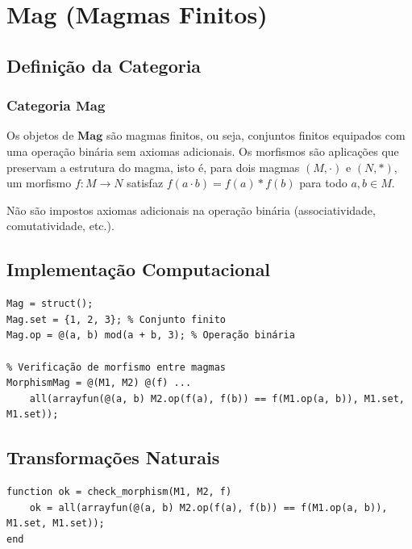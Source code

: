 \section{Mag (Magmas Finitos)}
\label{sec:mag}

\subsection{Definição da Categoria}

\subsubsection{Categoria $\mathbf{Mag}$}

\begin{definition}
    Os objetos de $\mathbf{Mag}$ são magmas finitos, ou seja, conjuntos finitos equipados com uma operação binária sem axiomas adicionais.
    Os morfismos são aplicações que preservam a estrutura do magma, isto é, para dois magmas $(M, \cdot)$ e $(N, \ast)$, um morfismo $f: M \to N$ satisfaz $f(a \cdot b) = f(a) \ast f(b)$ para todo $a, b \in M$.
\end{definition}

\begin{remark}
    Não são impostos axiomas adicionais na operação binária (associatividade, comutatividade, etc.).
\end{remark}

\subsection{Implementação Computacional}

\begin{lstlisting}[style=matlab]
% Definição de um magma
Mag = struct();
Mag.set = {1, 2, 3}; % Conjunto finito
Mag.op = @(a, b) mod(a + b, 3); % Operação binária

% Verificação de morfismo entre magmas
MorphismMag = @(M1, M2) @(f) ...
    all(arrayfun(@(a, b) M2.op(f(a), f(b)) == f(M1.op(a, b)), M1.set, M1.set));
\end{lstlisting}

\subsection{Transformações Naturais}
\begin{lstlisting}[style=matlab]
function ok = check_morphism(M1, M2, f)
    ok = all(arrayfun(@(a, b) M2.op(f(a), f(b)) == f(M1.op(a, b)), M1.set, M1.set));
end
\end{lstlisting}